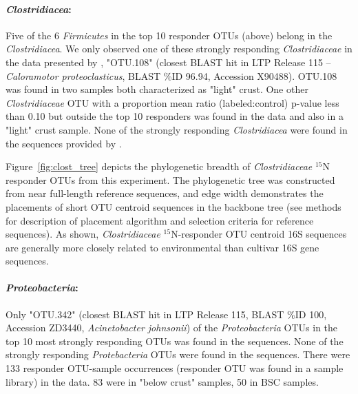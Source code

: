 \paragraph{\textbf{\textit{Clostridiacea}:}} Five of the 6
\textit{Firmicutes} in the top 10 responder OTUs (above) belong in the
\textit{Clostridiacea}. We only observed one of these strongly responding
\textit{Clostridiaceae} in the data presented by \citet{Garcia_Pichel_2013},
"OTU.108" (closest BLAST hit in LTP Release 115 -- \textit{Caloramotor
proteoclasticus}, BLAST \%ID 96.94, Accession X90488).  OTU.108 was found in
two samples both characterized as "light" crust. One other
\textit{Clostridiaceae} OTU with a proportion mean ratio (labeled:control)
p-value less than 0.10 but outside the top 10 responders was found in the
\citet{Garcia_Pichel_2013} data and also in a "light" crust sample. None of
the strongly responding \textit{Clostridiacea} were found in the sequences
provided by \citet{Steven_2013}.

Figure~\ref{fig:clost_tree} depicts the phylogenetic breadth of
\textit{Clostridiaceae} $^{15}$N responder OTUs from this experiment. The
phylogenetic tree was constructed from near full-length reference sequences,
and edge width demonstrates the placements of short OTU centroid sequences in
the backbone tree (see methods for description of placement algorithm and
selection criteria for reference sequences). As shown,
\textit{Clostridiaceae} $^{15}$N-responder OTU centroid 16S sequences are
generally more closely related to environmental than cultivar 16S gene
sequences.   

\paragraph{\textbf{\textit{Proteobacteria}:}} Only "OTU.342" (closest
BLAST hit in LTP Release 115, BLAST \%ID 100, Accession ZD3440,
\textit{Acinetobacter johnsonii}) of the \textit{Proteobacteria} OTUs in the
top 10 most strongly responding OTUs was found in the
\citet{Garcia_Pichel_2013} sequences. None of the strongly responding
\textit{Protebacteria} OTUs were found in the \citet{Steven_2013} sequences.
There were 133 responder OTU-sample occurrences (responder OTU was found in a
sample library) in the \citet{Steven_2013} data.  83 were in "below crust"
samples, 50 in BSC samples.

